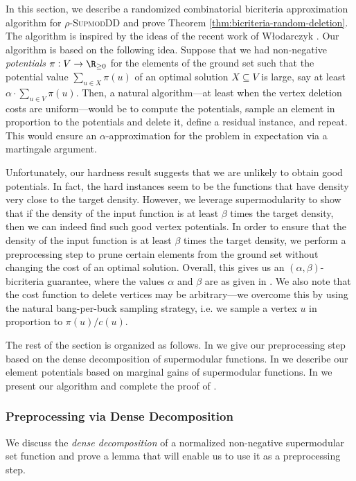 \documentclass{article}
\newcommand{\supmoddensitydeletionset}{\textsc{SupmodDD}\xspace}
\begin{document}
In this section, we describe a randomized combinatorial bicriteria approximation algorithm for $\rho$-\supmoddensitydeletionset and prove Theorem \ref{thm:bicriteria-random-deletion}. 
 The algorithm is inspired by the ideas of the recent work of Włodarczyk \cite{Włodarczyk_2024}.
Our algorithm is based on the following  idea.  Suppose that we had 
non-negative \emph{potentials} $\pi:V\rightarrow\R_{\geq 0}$ for the elements of the ground set   
such that the potential value $\sum_{u\in X}\pi(u)$ of an optimal solution $X \subseteq V$ is large, say at least $\alpha\cdot\sum_{u \in V}\pi(u)$.
Then, a natural algorithm---at least when the vertex deletion costs are uniform---would be to 
compute the potentials, 
sample an element in proportion to the potentials and delete it, define a residual instance, and repeat. 
This would ensure an $\alpha$-approximation for the problem in expectation via a martingale argument.

Unfortunately, our hardness result suggests that we are unlikely to obtain good potentials. In fact, the hard instances seem to be the functions that have density very close to the target density. However, we leverage supermodularity to show that if the density of the input function is at least $\beta$ times the target density, then we can indeed find such good vertex potentials. 
In order to ensure that the density of the input function is at least $\beta$ times the target density, we perform a preprocessing step to prune certain elements from the ground set without changing the cost of an optimal solution. 
Overall, this gives us an $(\alpha, \beta)$-bicriteria guarantee, where the values $\alpha$ and $\beta$ are as given in . We also note that the cost function to delete vertices may be arbitrary---we overcome this by using the natural bang-per-buck sampling strategy, i.e. we sample a vertex $u$ in proportion to $\pi(u)/c(u)$.

The rest of the section is organized as follows. 
In  we give our preprocessing step based on the dense decomposition of supermodular functions. 
In  we describe our element potentials based on marginal gains of supermodular functions. 
In  we present our algorithm and complete the proof of .

\subsubsection{Preprocessing via Dense Decomposition}\label{sec:dense-decomposition}
We discuss the \emph{dense decomposition} of a normalized non-negative supermodular set function \cite{hqc-22, Fujishige_1980} and prove a lemma that will enable us to use it as a preprocessing step. 
\end{document}
